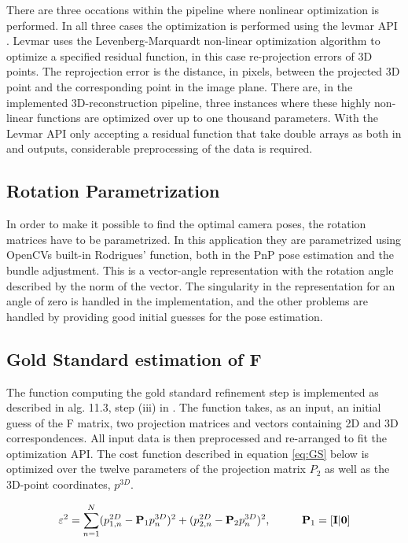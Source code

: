 There are three occations within the pipeline where nonlinear optimization is performed. In all three cases the optimization is performed using the levmar API \cite{levmar}. Levmar uses the Levenberg-Marquardt non-linear optimization algorithm to optimize a specified residual function, in this case re-projection errors of 3D points. The reprojection error is the distance, in pixels, between the projected 3D point and the corresponding point in the image plane. There are, in the implemented 3D-reconstruction pipeline, three instances where these highly non-linear functions are optimized over up to one thousand parameters. With the Levmar API only accepting a residual function that take double arrays as both in and outputs, considerable preprocessing of the data is required.

\subsection{Rotation Parametrization}
In order to make it possible to find the optimal camera poses, the rotation matrices have to be parametrized. In this application they are parametrized using OpenCVs built-in Rodrigues' function, both in the PnP pose estimation and the bundle adjustment. This is a vector-angle representation with the rotation angle described by the norm of the vector. The singularity in the representation for an angle of zero is handled in the implementation, and the other problems are handled by providing good initial guesses for the pose estimation.

\subsection{Gold Standard estimation of F}
The function computing the gold standard refinement step is implemented as described in alg. 11.3, step (iii) in \cite{HZ}. The function takes, as an input, an initial guess of the F matrix, two projection matrices and vectors containing 2D and 3D correspondences. All input data is then preprocessed and re-arranged to fit the optimization API. The cost function described in equation \eqref{eq:GS} below is optimized over the twelve parameters of the projection matrix $P_2$ as well as the 3D-point coordinates, $p^{3D}$. 

\begin{equation}
\label{eq:GS}
\varepsilon^2 = \sum_{n=1}^{N} (p_{1,n}^{2D} - \textbf{P}_1p_{n}^{3D})^2 + (p_{2,n}^{2D} - \textbf{P}_2p_{n}^{3D})^2, \hspace{1cm} \textbf{P}_1 = [\bf{I} | \bf{0}]
\end{equation} 

